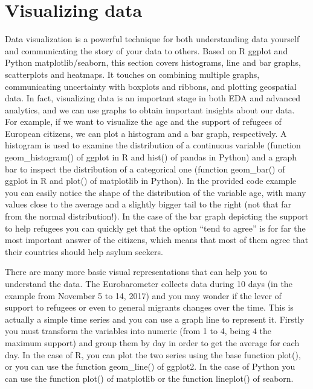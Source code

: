 \section{Visualizing data}

Data visualization is a powerful technique for both understanding data yourself and communicating the story of your data to others. Based on R ggplot and Python matplotlib/seaborn, this section covers histograms, line and bar graphs, scatterplots and heatmaps. It touches on combining multiple graphs, communicating uncertainty with boxplots and ribbons, and plotting geospatial data.  In fact, visualizing data is an important stage in both EDA and advanced analytics, and we can use graphs to obtain important insights about our data. For example, if we want to visualize the age and the support of refugees of European citizens, we can plot a histogram and a bar graph, respectively. A histogram is used to examine the distribution of a continuous variable (function geom\_histogram() of ggplot in R and hist() of pandas in Python) and a graph bar to inspect the distribution of a categorical one (function geom\_bar() of ggplot in R and plot() of matplotlib in Python). In the provided code example you can easily notice the shape of the distribution of the variable age, with many values close to the average and a slightly bigger tail to the right (not that far from the normal distribution!).  In the case of the bar graph depicting the support to help refugees you can quickly get that the option “tend to agree” is for far the most important answer of the citizens, which means that most of them agree that their countries should help asylum seekers.


There are many more basic visual representations that can help you to understand the data. The Eurobarometer collects data during 10 days (in the example from November 5 to 14, 2017) and you may wonder if the lever of support to refugees or even to general migrants changes over the time. This is actually a simple time series and you can use a graph line to represent it. Firstly you must transform the variables into numeric (from 1 to 4, being 4 the maximum support) and group them by day in order to get the average for each day. In the case of R, you can plot the two series using the base function plot(), or you can use the function geom\_line() of ggplot2. In the case of Python you can use the function plot() of matplotlib or the function lineplot() of seaborn.	

